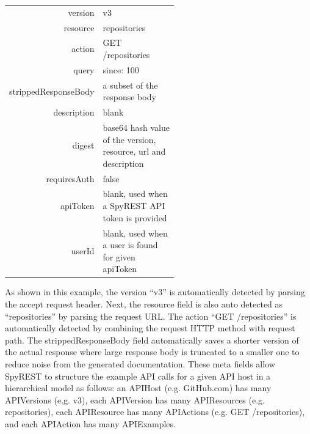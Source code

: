\footnotesize
\begin{tabular}{r p{0.55\linewidth}}
  version & v3 \\
  resource & repositories \\
  action & GET /repositories \\
  query & since: 100 \\
  strippedResponseBody & a subset of the response body \\
  description & blank \\
  digest & base64 hash value of the version, resource, url and description \\
  requiresAuth & false \\
  apiToken & blank, used when a SpyREST API token is provided \\
  userId & blank, used when a user is found for given apiToken \\
\end{tabular}
\normalsize

As shown in this example, the version ``v3'' is automatically detected by parsing the accept request header. Next, the resource field is also auto detected as ``repositories'' by parsing the request URL. The action ``GET /repositories'' is automatically detected by combining the request HTTP method with request path. The strippedResponseBody field automatically saves a shorter version of the actual response where large response body is truncated to a smaller one to reduce noise from the generated documentation. These meta fields allow SpyREST to structure the example API calls for a given API host in a hierarchical model as follows: an APIHost (e.g. GitHub.com) has many APIVersions (e.g. v3), each APIVersion has many APIResources (e.g. repositories), each APIResource has many APIActions (e.g. GET /repositories), and each APIAction has many APIExamples.

